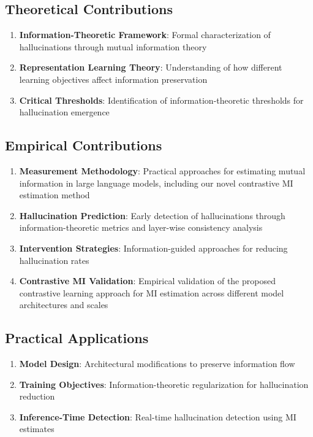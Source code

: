 \subsection{Theoretical Contributions}
\begin{enumerate}
    \item \textbf{Information-Theoretic Framework}: Formal characterization of hallucinations through mutual information theory
    \item \textbf{Representation Learning Theory}: Understanding of how different learning objectives affect information preservation
    \item \textbf{Critical Thresholds}: Identification of information-theoretic thresholds for hallucination emergence
\end{enumerate}

\subsection{Empirical Contributions}
\begin{enumerate}
    \item \textbf{Measurement Methodology}: Practical approaches for estimating mutual information in large language models, including our novel contrastive MI estimation method
    \item \textbf{Hallucination Prediction}: Early detection of hallucinations through information-theoretic metrics and layer-wise consistency analysis
    \item \textbf{Intervention Strategies}: Information-guided approaches for reducing hallucination rates
    \item \textbf{Contrastive MI Validation}: Empirical validation of the proposed contrastive learning approach for MI estimation across different model architectures and scales
\end{enumerate}

\subsection{Practical Applications}
\begin{enumerate}
    \item \textbf{Model Design}: Architectural modifications to preserve information flow
    \item \textbf{Training Objectives}: Information-theoretic regularization for hallucination reduction
    \item \textbf{Inference-Time Detection}: Real-time hallucination detection using MI estimates
\end{enumerate}

